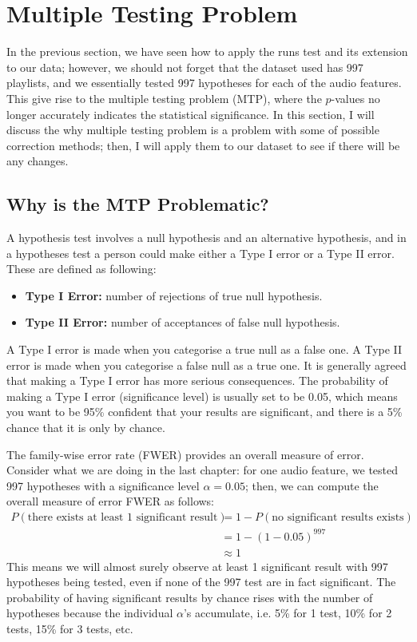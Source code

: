 \documentclass[12pt]{article}
\theoremstyle{plain}
\theoremstyle{definition}
\theoremstyle{remark}
\begin{document}
\clearpage



\section{Multiple Testing Problem}
In the previous section, we have seen how to apply the runs test and its extension to our data; however, we should not forget that the dataset used has 997 playlists, and we essentially tested 997 hypotheses for each of the audio features. This give rise to the multiple testing problem (MTP), where the $p$-values no longer accurately indicates the statistical significance\cite{5.2}. In this section, I will discuss the why multiple testing problem is a problem with some of possible correction methods; then, I will apply them to our dataset to see if there will be any changes.


\subsection{Why is the MTP Problematic?}
A hypothesis test involves a null hypothesis and an alternative hypothesis, and in a hypotheses test a person could make either a Type I error or a Type II error. These are defined as following\cite{5.2}:
\begin{itemize}
    \item \textbf{Type I Error:} number of rejections of true null hypothesis.
    \item \textbf{Type II Error:} number of acceptances of false null hypothesis.
\end{itemize}
A Type I error is made when you categorise a true null as a false one. A Type II error is made when you categorise a false null as a true one. It is generally agreed that making a Type I error has more serious consequences.\cite{5.2} The probability of making a Type I error (significance level) is usually set to be 0.05, which means you want to be 95\% confident that your results are significant, and there is a 5\% chance that it is only by chance.\cite{5.4}

The family-wise error rate (FWER) provides an overall measure of error.\cite{5.1} Consider what we are doing in the last chapter: for one audio feature, we tested 997 hypotheses with a significance level $\alpha=0.05$; then, we can compute the overall measure of error FWER\cite{5.4} as follows:
\begin{align*}
    P(\text{there exists at least 1 significant result})&=1-P(\text{no significant results exists})\\
    &=1-(1-0.05)^{997}\\
    &\approx 1
\end{align*}
This means we will almost surely observe at least 1 significant result with 997 hypotheses being tested, even if none of the 997 test are in fact significant. The probability of having significant results by chance rises with the number of hypotheses because the individual $\alpha$'s accumulate, i.e. 5\% for 1 test, 10\% for 2 tests, 15\% for 3 tests, etc.\cite{5.4}
\end{document}
